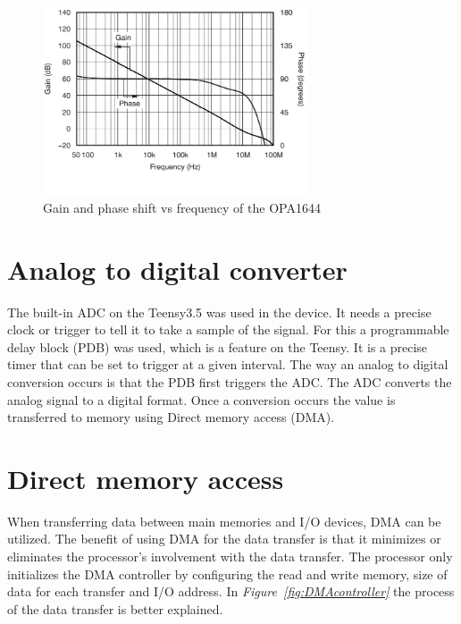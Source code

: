 \begin{figure}[h]
    \centering
    \includegraphics[width=0.7\textwidth]{graphics/dbVsfreq.png}
    \caption{Gain and phase shift vs frequency of the OPA1644\cite{noauthor_opa164x_nodate}}
    \label{fig:dbvsFreq}
\end{figure}


\vspace{4cm}

\section{Analog to digital converter}

The built-in ADC on the Teensy3.5 was used in the device.
It needs a precise clock or trigger to tell it to take a sample of the signal.
For this a programmable delay block (PDB) was used, which is a feature on the Teensy. 
It is a precise timer that can be set to trigger at a given interval.
The way an analog to digital conversion occurs is that the PDB first triggers the ADC.
The ADC converts the analog signal to a digital format.
Once a conversion occurs the value is transferred to memory using Direct memory access (DMA).


\section{Direct memory access}

When transferring data between main memories and I/O devices, DMA can be utilized.
The benefit of using DMA for the data transfer is that it minimizes or eliminates the processor's involvement with the data transfer.
The processor only initializes the DMA controller by configuring the read and write memory, size of data for each transfer and I/O address.
In \textit{Figure~\ref{fig:DMAcontroller}} the process of the data transfer is better explained.

